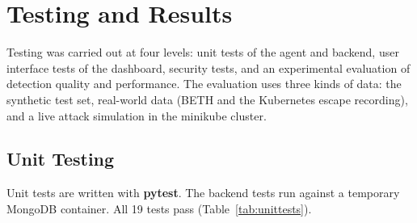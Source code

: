 \chapter{Testing and Results}

Testing was carried out at four levels: unit tests of the agent and backend, user
interface tests of the dashboard, security tests, and an experimental evaluation of
detection quality and performance. The evaluation uses three kinds of data: the
synthetic test set, real-world data (BETH and the Kubernetes escape recording), and a
live attack simulation in the minikube cluster.

\section{Unit Testing}

Unit tests are written with \textbf{pytest}. The backend tests run against a temporary
MongoDB container. All 19 tests pass (Table~\ref{tab:unittests}).

